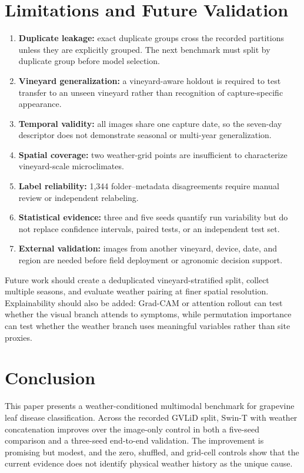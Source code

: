 \documentclass[conference]{IEEEtran}
\begin{document}
\section{Limitations and Future Validation}
\begin{enumerate}
    \item \textbf{Duplicate leakage:} exact duplicate groups cross the recorded partitions unless they are explicitly grouped. The next benchmark must split by duplicate group before model selection.
    \item \textbf{Vineyard generalization:} a vineyard-aware holdout is required to test transfer to an unseen vineyard rather than recognition of capture-specific appearance.
    \item \textbf{Temporal validity:} all images share one capture date, so the seven-day descriptor does not demonstrate seasonal or multi-year generalization.
    \item \textbf{Spatial coverage:} two weather-grid points are insufficient to characterize vineyard-scale microclimates.
    \item \textbf{Label reliability:} 1,344 folder--metadata disagreements require manual review or independent relabeling.
    \item \textbf{Statistical evidence:} three and five seeds quantify run variability but do not replace confidence intervals, paired tests, or an independent test set.
    \item \textbf{External validation:} images from another vineyard, device, date, and region are needed before field deployment or agronomic decision support.
\end{enumerate}

Future work should create a deduplicated vineyard-stratified split, collect multiple seasons, and evaluate weather pairing at finer spatial resolution. Explainability should also be added: Grad-CAM or attention rollout can test whether the visual branch attends to symptoms, while permutation importance can test whether the weather branch uses meaningful variables rather than site proxies.

\section{Conclusion}
This paper presents a weather-conditioned multimodal benchmark for grapevine leaf disease classification. Across the recorded GVLiD split, Swin-T with weather concatenation improves over the image-only control in both a five-seed comparison and a three-seed end-to-end validation. The improvement is promising but modest, and the zero, shuffled, and grid-cell controls show that the current evidence does not identify physical weather history as the unique cause.
\end{document}
